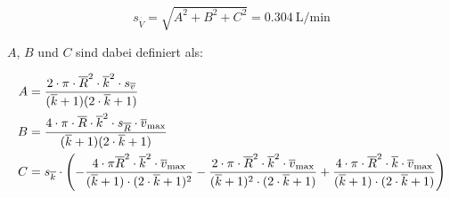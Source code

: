 \begin{equation}
    \label{eq:errorTurbulent:simple}
    s_{\overline{\dot{V}}} = \sqrt{ A^2 + B^2 + C^2 } = \SI{0.304}{\liter\per\minute}
\end{equation}

\noindent $A$, $B$ und $C$ sind dabei definiert als:

\begin{align}
    \label{eq:errorTurbulent:complicated}
    A
    &=
    \frac{%
        2
        \cdot
        \pi
        \cdot
        \overline{R}^2
        \cdot
        \overline{k}^2
        \cdot
        s_{\overline{v}}
    }{%
        (
            \overline{k}
            +
            1
        )
        (
            2
            \cdot
            \overline{k}
            +
            1
        )
    }
    \\
    B
    &=
    \frac{%
        4
        \cdot
        \pi
        \cdot
        \overline{R}
        \cdot
        \overline{k}^2
        \cdot
        s_{\overline{R}}
        \cdot
        \overline{v}_{\mathrm{max}}
    }{%
        (
            \overline{k}
            +
            1
        )
        (
            2
            \cdot
            \overline{k}
            +
            1
        )
    }
    \\
    C
    &=
    s_{\overline{k}}
    \cdot
    \left(
        -
        \frac{%
            4
            \cdot
            \pi
            \overline{R}^2
            \cdot
            \overline{k}^2
            \cdot
            \overline{v}_{\mathrm{max}}
        }{%
            (
                \overline{k}
                +
                1
            )
            \cdot
            (
                2
                \cdot
                \overline{k}
                +
                1
            )^2
        }
        -
        \frac{%
            2
            \cdot
            \pi
            \cdot
            \overline{R}^2
            \cdot
            \overline{k}^2
            \cdot
            \overline{v}_{\mathrm{max}}
        }{%
            (
                \overline{k}
                +
                1
            )^2
            \cdot
            (
                2
                \cdot
                \overline{k}
                +
                1
            )
        }
        +
        \frac{%
            4
            \cdot
            \pi
            \cdot
            \overline{R}^2
            \cdot
            \overline{k}
            \cdot
            \overline{v}_{\mathrm{max}}
        }{%
            (
                \overline{k}
                +
                1
            )
            \cdot
            (
                2
                \cdot
                \overline{k}
                +
                1
            )
        }
    \right)
\end{align}

